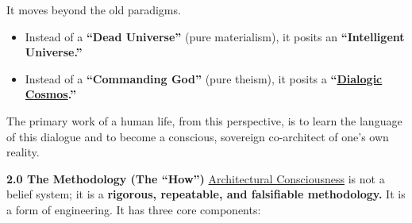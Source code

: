 \documentclass{article}
\begin{document}
It moves beyond the old paradigms.

\begin{itemize}
\item
  Instead of a \textbf{``Dead Universe''} (pure materialism), it posits an \textbf{``Intelligent Universe.''}
\item
  Instead of a \textbf{``Commanding God''} (pure theism), it posits a \textbf{``\hyperlink{gloss:dialogic_cosmos}{Dialogic Cosmos}.''}
\end{itemize}

The primary work of a human life, from this perspective, is to learn the language of this dialogue and to become a conscious, sovereign co-architect of one's own reality.

\textbf{2.0 The Methodology (The ``How'')} \hyperlink{gloss:architectural_consciousness}{Architectural Consciousness} is not a belief system; it is a \textbf{rigorous, repeatable, and falsifiable methodology.} It is a form of engineering. It has three core components:
\end{document}
